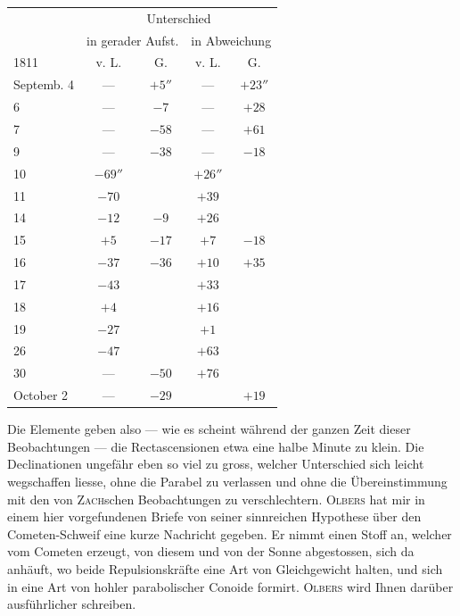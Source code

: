 \begin{center}\fontsize{10}{12}\selectfont\setlength{\tabcolsep}{6pt}\renewcommand{\arraystretch}{1.15}\begin{tabular}{l|c|c|c|c}
 & \multicolumn{4}{c}{Unterschied}\\
 & \multicolumn{2}{c|}{in gerader Aufst.} & \multicolumn{2}{c}{in Abweichung} \\
1811 & v. L. & G. & v. L. & G. \\\hline
Septemb. 4 & --- & $+5''$ & --- & $+23''$ \\
6 & --- & $-7$ & --- & $+28$ \\
7 & --- & $-58$ & --- & $+61$ \\
9 & --- & $-38$ & --- & $-18$ \\
10 & $-69''$ & & $+26''$ & \\
11 & $-70$ & & $+39$ & \\
14 & $-12$ & $-9$ & $+26$ & \\
15 & $+5$ & $-17$ & $+7$ & $-18$ \\
16 & $-37$ & $-36$ & $+10$ & $+35$ \\
17 & $-43$ & & $+33$ & \\
18 & $+4$ & & $+16$ & \\
19 & $-27$ & & $+1$ & \\
26 & $-47$ & & $+63$ & \\
30 & --- & $-50$ & $+76$ & \\
October 2 & --- & $-29$ & & $+19$ \\
\end{tabular}
\end{center}

\par\indent Die Elemente geben also --- wie es scheint während der ganzen Zeit dieser Beobachtungen --- die Rectascensionen etwa eine halbe Minute zu klein. Die Declinationen ungefähr eben so viel zu gross, welcher Unterschied sich leicht wegschaffen liesse, ohne die Parabel zu verlassen und ohne die Übereinstimmung mit den von \textsc{Zach}schen Beobachtungen zu verschlechtern. \textsc{Olbers} hat mir in einem hier vorgefundenen Briefe von seiner sinnreichen Hypothese über den Cometen-Schweif eine kurze Nachricht gegeben. Er nimmt einen Stoff an, welcher vom Cometen erzeugt, von diesem und von der Sonne abgestossen, sich da anhäuft, wo beide Repulsionskräfte eine Art von Gleichgewicht halten, und sich in eine Art von hohler parabolischer Conoide formirt. \textsc{Olbers} wird Ihnen darüber ausführlicher schreiben.
